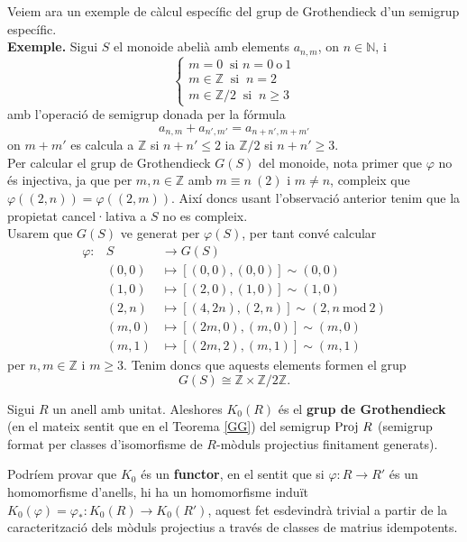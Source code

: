 Veiem ara un exemple de càlcul específic del grup de Grothendieck d'un semigrup específic. \\
\textup{\textbf{Exemple.}
Sigui $S$ el monoide abelià amb elements $a_{n,m}$, on $n\in \mathbb{N}$, i
$$
\begin{cases}
m=0 \ \text{ si } n=0 \ \text{o} \  1\\
m\in \mathbb{Z} \ \text{ si } \  n=2 \\
m\in \mathbb{Z}/2 \ \text{ si } \ n\geq 3
\end{cases}
$$
amb l'operació de semigrup donada per la fórmula
$$
a_{n,m}+a_{n',m'}=a_{n+n',m+m'}
$$
on $m+m'$ es calcula a $\mathbb{Z}$ si $n+n' \leq 2$ ia $\mathbb{Z}/2$ si $n+n' \geq 3$. \\
\indent Per calcular el grup de Grothendieck $G(S)$ del monoide, nota primer que $\varphi$ no és injectiva, ja que per $m,n\in \mathbb{Z}$ amb $m \equiv n\ (2)$ i $m\neq n$, compleix que $\varphi((2,n))=\varphi((2,m))$. Així doncs usant l'observació anterior tenim que la propietat cancel·lativa a $S$ no es compleix. \\
Usarem que $G(S)$ ve generat per $\varphi(S)$, per tant convé calcular
\begin{eqnarray*}
\varphi:&S & \rightarrow  G(S)\\
&(0,0) & \mapsto  [(0,0),(0,0)] \sim (0,0) \\
&(1,0) & \mapsto  [(2,0),(1,0)] \sim (1,0) \\
&(2,n) & \mapsto  [(4,2n),(2,n)] \sim (2,n \ \text{mod} \ 2) \\
&(m,0) & \mapsto  [(2m,0),(m,0)] \sim (m,0) \\
&(m,1) & \mapsto  [(2m,2),(m,1)] \sim (m,1)
\end{eqnarray*}
per $n,m\in \mathbb{Z}$ i $m \geq 3$. Tenim doncs que aquests elements formen el grup $$G(S)\cong\mathbb{Z}\times \mathbb{Z}/2\mathbb{Z}.$$
}

\begin{definition} Sigui $R$ un anell amb unitat. Aleshores $K_0(R)$ és el \textbf{grup de Grothendieck} (en el mateix sentit que en el Teorema \ref{GG}) del semigrup $\mathrm{Proj} \  R$ (semigrup format per classes d'isomorfisme de $R$-mòduls projectius finitament generats).
\end{definition}

Podríem provar que $K_0$ és un \textbf{functor}, en el sentit que si $\varphi: R \rightarrow R'$ és un homomorfisme d'anells, hi ha un homomorfisme induït $K_0(\varphi)=\varphi_*:K_0(R)\rightarrow K_0(R')$, aquest fet esdevindrà trivial a partir de la caracterització dels mòduls projectius a través de classes de matrius idempotents.

